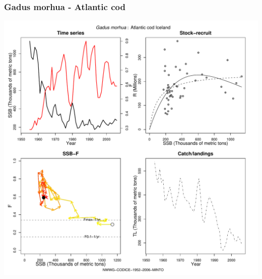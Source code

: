 \subsubsection{Gadus morhua - Atlantic cod}
\begin{center}
\includegraphics[width=1.2\textwidth]{../R/figures/NWWG-CODICE-1952-2006-MINTO.pdf}
\end{center}

